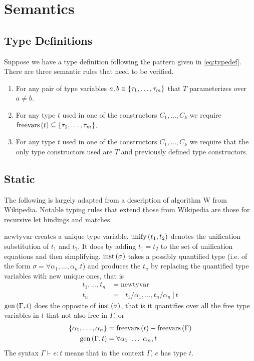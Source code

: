 \documentclass[12pt]{article}
\newcommand{\newtyvar}{\mathrm{newtyvar}}
\newcommand{\inst}[1]{\mathrm{inst}\del{#1}}
\newcommand{\gen}[2]{\mathrm{gen}\del{#1, #2}}
\newcommand{\freevars}[1]{\mathrm{freevars}\del{#1}}
\newcommand{\unify}[2]{\mathrm{unify}\del{#1, #2}}
\begin{document}
\section{Semantics}
\label{app:semantics}


\subsection{Type Definitions}
\label{sec:type_defs}

Suppose we have a type definition following the pattern given in
\eqref{eq:typedef}.
There are three semantic rules that need to be verified.
\begin{enumerate}
\item For any pair of type variables
  $a, b \in \cbr{\tau_1,\ldots,\tau_m}$ that $T$ parameterizes over
  $a \neq b$.

\item For any type $t$ used in one of the constructors
  $C_1,\ldots,C_k$ we require
  $\freevars{t} \subseteq \cbr{\tau_1,\ldots,\tau_m}$.

\item For any type $t$ used in one of the constructors
  $C_1,\ldots,C_k$ we require that the only type constructors used are
  $T$ and previously defined type constructors.
\end{enumerate}


\subsection{Static}
\label{sec:static_semantics}

The following is largely adapted from a description of algorithm W
from Wikipedia\cite{wikiAlgW}.
Notable typing rules that extend those from Wikipedia are those for
recursive let bindings and matches.

$\newtyvar$ creates a unique type variable.
$\unify{t_1}{t_2}$ denotes the unification substitution of $t_1$ and
$t_2$.
It does by adding $t_1 = t_2$ to the set of unification equations and
then simplifying.
$\inst{\sigma}$ takes a possibly quantified type (i.e. of the form
$\sigma = \forall \alpha_1, \ldots, \alpha_n. t$) and produces the
$t_u$ by replacing the
quantified type variables with new unique ones, that is
\begin{align*}
  t_1,\ldots,t_n &= \newtyvar\\
  t_u &= [t_1/\alpha_1, \ldots, t_n/\alpha_n] t
\end{align*}
$\gen{\Gamma}{t}$ does the opposite of $\inst{\sigma}$, that is it
quantifies over all the free type variables in $t$ that not also free
in $\Gamma$, or
\begin{align*}
  \cbr{\alpha_1, \ldots, \alpha_n} &= \freevars{t} - \freevars{\Gamma}\\
  \gen{\Gamma}{t} &= \forall \alpha_1~\ldots~\alpha_n, t
\end{align*}
The syntax $\Gamma \vdash e : t$ means that in the context
$\Gamma$, $e$ has type $t$.
\end{document}
